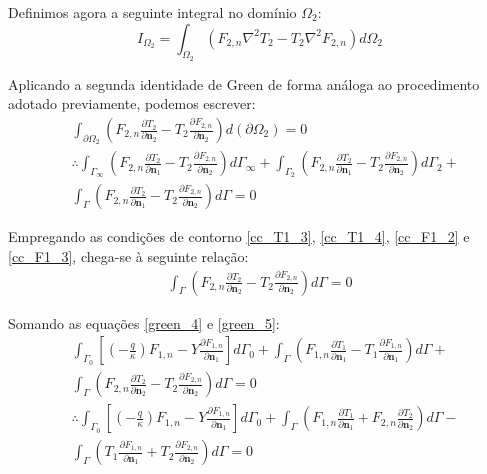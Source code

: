 Definimos agora a seguinte integral no domínio $\Omega_2$:
\begin{equation}
	I_{\Omega_2} = \int_{\Omega_2}(F_{2,n}\nabla^2T_2 - T_2\nabla^2F_{2,n})d\Omega_2
\end{equation}

Aplicando a segunda identidade de Green de forma análoga ao procedimento adotado previamente, podemos escrever:
 \begin{align}
	&
	\int_{\partial\Omega_2}\left(F_{2,n}\frac{\partial T_2}{\partial\mathbf{n}_2} - T_2\frac{\partial F_{2,n}}{\partial\mathbf{n}_2}\right)d(\partial\Omega_2)
	=
	0 \nonumber \\
	&
	\therefore
	\int_{\Gamma_\infty}\left(F_{2,n}\frac{\partial T_2}{\partial\mathbf{n}_1} - T_2\frac{\partial F_{2,n}}{\partial\mathbf{n}_2}\right)d\Gamma_\infty
	+
	\int_{\Gamma_2}\left(F_{2,n}\frac{\partial T_2}{\partial\mathbf{n}_1} - T_2\frac{\partial F_{2,n}}{\partial\mathbf{n}_2}\right)d\Gamma_2
	+ \nonumber \\
	&
	\int_{\Gamma}\left(F_{2,n}\frac{\partial T_2}{\partial\mathbf{n}_1} - T_2\frac{\partial F_{2,n}}{\partial\mathbf{n}_2}\right)d\Gamma
	=
	0
\end{align}

Empregando as condições de contorno \eqref{cc_T1_3}, \eqref{cc_T1_4}, \eqref{cc_F1_2} e \eqref{cc_F1_3}, chega-se à seguinte relação:
\begin{align}
	\int_{\Gamma}\left(F_{2,n}\frac{\partial T_2}{\partial\mathbf{n}_2} - T_2\frac{\partial F_{2,n}}{\partial\mathbf{n}_2}\right)d\Gamma
	=
	0 \label{green_5}
\end{align}


Somando as equações \eqref{green_4} e \eqref{green_5}:
\begin{align}
	&
	\int_{\Gamma_0}\left[\left(-\frac{q}{\kappa}\right)F_{1,n} - Y\frac{\partial F_{1,n}}{\partial\mathbf{n}_1}\right]d\Gamma_0
	+
	\int_{\Gamma}\left(F_{1,n}\frac{\partial T_1}{\partial\mathbf{n}_1} - T_1\frac{\partial F_{1,n}}{\partial\mathbf{n}_1}\right)d\Gamma
	+ \nonumber \\
	&
	\int_{\Gamma}\left(F_{2,n}\frac{\partial T_2}{\partial\mathbf{n}_2} - T_2\frac{\partial F_{2,n}}{\partial\mathbf{n}_2}\right)d\Gamma
	=
	0 \\
	&
	\therefore
	\int_{\Gamma_0}\left[\left(-\frac{q}{\kappa}\right)F_{1,n} - Y\frac{\partial F_{1,n}}{\partial\mathbf{n}_1}\right]d\Gamma_0
	+
	\int_{\Gamma}\left(F_{1,n}\frac{\partial T_1}{\partial\mathbf{n}_1} + F_{2,n}\frac{\partial T_2}{\partial\mathbf{n}_2} \right)d\Gamma
	- \nonumber \\
	&
	\int_{\Gamma}\left(T_1\frac{\partial F_{1,n}}{\partial\mathbf{n}_1} + T_2\frac{\partial F_{2,n}}{\partial\mathbf{n}_2} \right)d\Gamma
	=
	0
\end{align}

